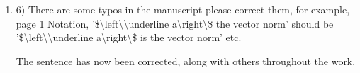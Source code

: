 \documentclass[a4paper]{scrartcl}
\newenvironment{rebuttal}{\begin{enumerate}[label={\color{grey}\thesection.\arabic{enumi}},leftmargin=0pt,ref=\thesection.\arabic{enumi}]}{\end{enumerate}}
\newcommand{\reviewtext}[1]{{\color{nblue} #1}}
\begin{document}
\begin{rebuttal}
\item \reviewtext{6) There are some typos in the manuscript please correct them, for example, page 1 Notation, '\$\textbackslash left\textbackslash\textbar\textbackslash underline a\textbackslash right\textbackslash\textbar\$ the vector norm' should be '\$\textbackslash left\textbackslash\textbar\textbackslash underline a\textbackslash right\textbackslash\textbar\$ is the vector norm' etc.}

The sentence has now been corrected, along with others throughout the work.

\end{rebuttal}

% 
\end{document}
